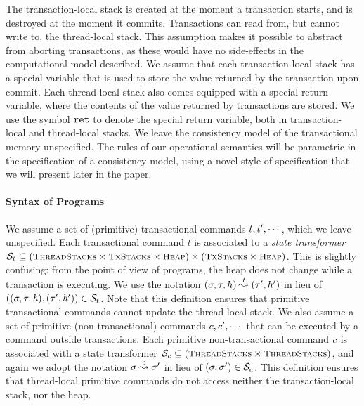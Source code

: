 \documentclass[a4paper,UKenglish]{article}%
\theoremstyle{plain}
\begin{document}
The transaction-local stack is created at the moment a transaction starts, 
and is destroyed at the moment it commits. 
Transactions can read from, but cannot 
write to, the thread-local stack. This assumption makes it possible to abstract from 
aborting transactions, as these would have no side-effects in the computational model described. 
We assume that each transaction-local 
stack has a special variable that is used to store the value returned by the transaction 
upon commit. Each thread-local stack also comes equipped with a special return variable, 
where the contents of the value returned by transactions are stored. We use the symbol 
$\texttt{ret}$ to denote the special return variable, both in transaction-local and thread-local 
stacks.
We leave the consistency model of the transactional memory unspecified. The rules 
of our operational semantics will be parametric in the specification of a consistency 
model, using a novel style of specification that we will present later in the paper. 

\paragraph{\textbf{Syntax of Programs}}
We assume a set of (primitive) transactional commands $t,t',\cdots$, which 
we leave unspecified. Each transactional command $t$ is associated to a \emph{state transformer} 
$\mathcal{S}_t \subseteq (\ThdStacks \times \TxStacks \times \Heaps) \times (\TxStacks \times \Heaps)$. 
\ac{This is slightly confusing: from the point of view of programs, the heap does not change 
while a transaction is executing.}
We use the notation $(\sigma, \tau, h) \overset{t}{\mathbin{\leadsto_{}}} (\tau' , h')$ 
in lieu of $((\sigma, \tau, \mathit{h}), (\tau', \mathit{h}' )) \in \mathcal{S}_t$. Note that this definition ensures 
that primitive transactional commands cannot update the thread-local stack.
We also assume a set of primitive (non-transactional) commands $c, c',\cdots$ 
that can be executed by a command outside transactions. Each primitive non-transactional 
command $c$ is associated with a state transformer $\mathcal{S}_c \subseteq 
(\ThdStacks \times \ThdStacks)$, and again we adopt the notation $\sigma \overset{c}{\mathbin{\leadsto_{}}} 
\sigma'$ in lieu of $(\sigma, \sigma') \in \mathcal{S}_c$. This definition ensures that 
thread-local primitive commands do not access neither the transaction-local stack, nor the heap.
\end{document}
